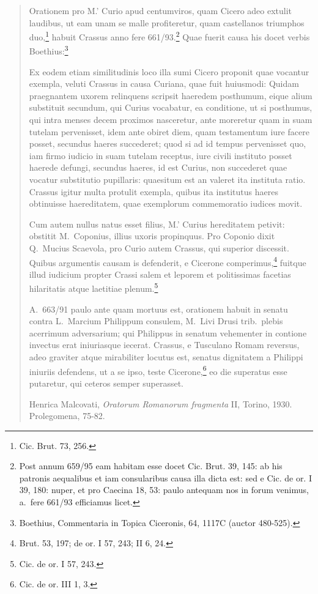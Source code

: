 \begin{quotation}
Orationem pro M.' Curio apud centumviros, quam Cicero adeo extulit laudibus, ut eam unam se malle profiteretur, quam castellanos triumphos duo,\footnote{Cic. Brut. 73, 256.} habuit Crassus anno fere 661/93.\footnote{Post annum 659/95 eam habitam esse docet Cic. Brut. 39, 145: ab his patronis aequalibus et iam consularibus causa illa dicta est: sed e Cic. de or. I 39, 180: nuper, et pro Caecina 18, 53: paulo antequam nos in forum venimus, a.\ fere 661/93 efficiamus licet.} Quae fuerit causa his docet verbis Boethius:\footnote{Boethius, Commentaria in Topica Ciceronis, 64, 1117C (auctor 480-525).}

Ex eodem etiam similitudinis loco illa sumi Cicero proponit quae vocantur exempla, veluti Crassus in causa Curiana, quae fuit huiusmodi: Quidam praegnantem uxorem relinquens scripsit haeredem posthumum, eique alium substituit secundum, qui Curius vocabatur, ea conditione, ut si posthumus, qui intra menses decem proximos nasceretur, ante moreretur quam in suam tutelam pervenisset, idem ante obiret diem, quam testamentum iure facere posset, secundus haeres succederet; quod si ad id tempus pervenisset quo, iam firmo iudicio in suam tutelam receptus, iure civili instituto posset haerede defungi, secundus haeres, id est Curius, non succederet quae vocatur substitutio pupillaris: quaesitum est an valeret ita instituta ratio. Crassus igitur multa protulit exempla, quibus ita institutus haeres obtinuisse haereditatem, quae exemplorum commemoratio iudices movit.

Cum autem nullus natus esset filius, M.' Curius hereditatem petivit: obstitit M.~Coponius, illius uxoris propinquus. Pro Coponio dixit Q.~Mucius Scaevola, pro Curio autem Crassus, qui superior discessit. Quibus argumentis causam is defenderit, e Cicerone comperimus,\footnote{Brut. 53, 197; de or. I 57, 243; II 6, 24.} fuitque illud iudicium propter Crassi salem et leporem et politissimas facetias hilaritatis atque laetitiae plenum.\footnote{Cic. de or. I 57, 243.}

A.\ 663/91 paulo ante quam mortuus est, orationem habuit in senatu contra L.~Marcium Philippum consulem, M.~Livi Drusi trib.\ plebis acerrimum adversarium; qui Philippus in senatum vehementer in contione invectus erat iniuriasque iecerat. Crassus, e Tusculano Romam reversus, adeo graviter atque mirabiliter locutus est, senatus dignitatem a Philippi iniuriis defendens, ut a se ipso, teste Cicerone,\footnote{Cic. de or. III 1, 3.} eo die superatus esse putaretur, qui ceteros semper superasset.

\noindent Henrica Malcovati, \textit{Oratorum Romanorum fragmenta} II, Torino, 1930. Prolegomena, 75-82.
\end{quotation}

